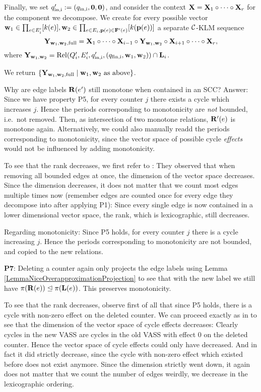 Finally, we set \(q_{\text{in,i}}':=(q_{\text{in,i}}, \mathbf{0}, \mathbf{0})\), and consider the context \(\mathbf{X}=\mathbf{X}_1 \circ \dots \circ \mathbf{X}_r\) for the component we decompose. We create for every possible vector \(\mathbf{w}_1 \in \prod_{e \in E_i'} [k(e)], \mathbf{w}_2 \in \prod_{e \in E_i, \mathbf{p}(e) \in \mathbf{F}'(e)} [k(\mathbf{p}(e))]\) a separate \(\mathcal{C}\)-KLM sequence 
\[\mathbf{Y}_{\mathbf{w}_1, \mathbf{w}_2, \text{full}}=\mathbf{X}_1 \circ \dots \circ \mathbf{X}_{i-1} \circ \mathbf{Y}_{\mathbf{w}_1, \mathbf{w}_2} \circ \mathbf{X}_{i+1} \circ \dots \circ \mathbf{X}_r,\] where \(\mathbf{Y}_{\mathbf{w}_1, \mathbf{w}_2}=\operatorname{Rel}(Q_i', E_i', q_{\text{in,i}}', (q_{\text{fin,i}}, \mathbf{w}_1, \mathbf{w}_2)) \cap \mathbf{L}_i\). 

We return \(\{\mathbf{Y}_{\mathbf{w}_1, \mathbf{w}_2, \text{full}} \mid \mathbf{w}_1, \mathbf{w}_2 \text{ as above}\}\).

Why are edge labels \(\mathbf{R}(e')\) still monotone when contained in an SCC? Answer: Since we have property P5, for every counter \(j\) there exists a cycle which increases \(j\). Hence the periods corresponding to monotonicity are \emph{not} bounded, i.e.\ not removed. Then, as intersection of two monotone relations, \(\mathbf{R}'(e)\) is monotone again. Alternatively, we could also manually readd the periods corresponding to monotonicity, since the vector space of possible cycle \emph{effects} would not be influenced by adding monotonicity.

To see that the rank decreases, we first refer to \cite{LerouxS19}: They observed that when removing all bounded edges at once, the dimension of the vector space decreases. Since the dimension decreases, it does not matter that we count most edges multiple times now (remember edges are counted once for every edge they decompose into after applying P1): Since every single edge is now contained in a lower dimensional vector space, the rank, which is lexicographic, still decreases.

Regarding monotonicity: Since P5 holds, for every counter \(j\) there is a cycle increasing \(j\). Hence the periods corresponding to monotonicity are not bounded, and copied to the new relations.

\textbf{P7}: Deleting a counter again only projects the edge labels using Lemma \ref{LemmaNiceOverapproximationProjection} to see that with the new label we still have \(\pi(\mathbf{R}(e)) \trianglelefteq \pi(\mathbf{L}(e))\). This preserves monotonicity.

To see that the rank decreases, observe first of all that since P5 holds, there is a cycle with non-zero effect on the deleted counter. We can proceed exactly as in \cite{LerouxS19} to see that the dimension of the vector space of cycle effects decreases: Clearly cycles in the new VASS are cycles in the old VASS with effect \(0\) on the deleted counter. Hence the vector space of cycle effects could only have decreased. And in fact it did strictly decrease, since the cycle with non-zero effect which existed before does not exist anymore. Since the dimension strictly went down, it again does not matter that we count the number of edges weirdly, we decrease in the lexicographic ordering.

